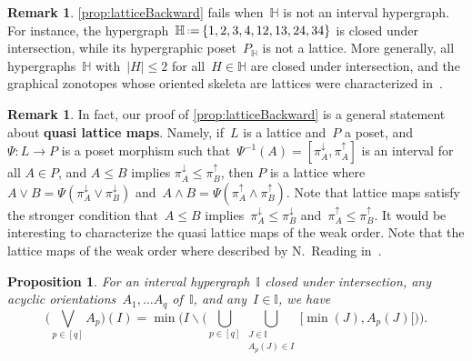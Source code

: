 \documentclass{amsart}
\newtheorem{proposition}[theorem]{Proposition}
\theoremstyle{definition}
\newtheorem{remark}[theorem]{Remark}
\newcommand{\ssm}{\smallsetminus} %
\newcommand{\eqdef}{\mbox{\,\raisebox{0.2ex}{\scriptsize\ensuremath{\mathrm:}}\ensuremath{=}\,}} %
\newcommand{\defn}[1]{\textbf{\textsf{\color{PineGreen} #1}}} %
\newcommand{\meet}{\wedge} %
\newcommand{\join}{\vee} %
\newcommand{\bigJoin}{\bigvee} %
\newcommand{\projDown}{\pi^\downarrow} %
\newcommand{\projUp}{\pi^\uparrow} %
\newcommand{\HH}{\mathbb H}  %
\newcommand{\II}{\mathbb I} %
\begin{document}
\begin{remark}
\cref{prop:latticeBackward} fails when~$\HH$ is not an interval hypergraph.
For instance, the hypergraph~$\HH \eqdef \{ 1, 2, 3, 4, 12, 13, 24, 34 \}$ is closed under intersection, while its hypergraphic poset~$P_\HH$ is not a lattice.
More generally, all hypergraphs~$\HH$ with~$|H| \le 2$ for all~$H \in \HH$ are closed under intersection, and the graphical zonotopes whose oriented skeleta are lattices were characterized in~\cite{Pilaud-acyclicReorientationLattices}.
\end{remark}

\begin{remark}
In fact, our proof of \cref{prop:latticeBackward} is a general statement about \defn{quasi lattice maps}.
Namely, if~$L$ is a lattice and~$P$ a poset, and $\Psi : L \to P$ is a poset morphism such that~$\Psi^{-1}(A) = [\projDown_A, \projUp_A]$ is an interval  for all $A\in P$, and $A \le B$ implies $\projDown_A \le \projUp_B$, then $P$ is a lattice where~$A \join B =\Psi(\projDown_A \join \projDown_B)$ and~$A \meet B =\Psi(\projUp_A \meet \projUp_B)$.
Note that lattice maps satisfy the stronger condition that~$A \le B$ implies~$\projDown_A \le \projDown_B$ and~$\projUp_A \le \projUp_B$.
It would be interesting to characterize the quasi lattice maps of the weak order.
Note that the lattice maps of the weak order where described by N.~Reading in~\cite{Reading-latticeCongruences, Reading-arcDiagrams}.
\end{remark}

\begin{proposition}
\label{prop:joinLattice}
For an interval hypergraph~$\II$ closed under intersection, any acyclic orientations~$A_1, \dots A_q$ of~$\II$, and any~${I \in \II}$, we have
\[
\Big( \bigJoin_{p \in [q]} A_p \Big)(I) = \min \bigg( I \ssm \Big( \bigcup_{p \in [q]} \bigcup_{\substack{J \in \II \\ A_p(J) \in I}} {[\min(J), A_p(J)[} \Big) \bigg).
\]
\end{proposition}
\end{document}
